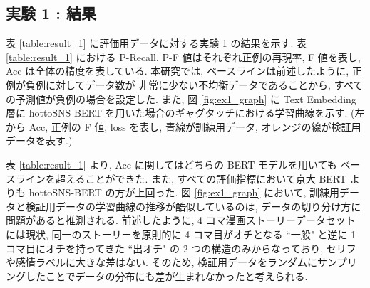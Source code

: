 \begin{table}[!h]
\vspace{10mm}
\caption{損失関数におけるクラス重み}
\label{table:ex_class_weight}
\centering
{}
\end{table}

\newpage
\changeindent{0cm}
\subsection{実験 1 : 結果}
\changeindent{2cm}

表 \ref{table:result_1} に評価用データに対する実験 1 の結果を示す. 表 \ref{table:result_1} における P-Recall, P-F 値はそれぞれ正例の再現率, F 値を表し, Acc は全体の精度を表している.
本研究では, ベースラインは前述したように, 正例が負例に対してデータ数が
非常に少ない不均衡データであることから, すべての予測値が負例の場合を設定した.
また, 図 \ref{fig:ex1_graph} に Text Embedding 層に hottoSNS-BERT を用いた場合のギャグタッチにおける学習曲線を示す. (左から Acc, 正例の F 値, loss を表し, 青線が訓練用データ, オレンジの線が検証用データを表す.)

表 \ref{table:result_1} より, Acc に関してはどちらの BERT モデルを用いても
ベースラインを超えることができた. また, すべての評価指標において京大 BERT よりも hottoSNS-BERT の方が上回った. 図 \ref{fig:ex1_graph} において, 訓練用データと検証用データの学習曲線の推移が酷似しているのは, データの切り分け方に問題があると推測される. 前述したように, 4 コマ漫画ストーリーデータセットには現状, 同一のストーリーを原則的に 4 コマ目がオチとなる ``一般" と逆に 1 コマ目にオチを持ってきた ``出オチ" の 2 つの構造のみからなっており, セリフや感情ラベルに大きな差はない. そのため, 検証用データをランダムにサンプリングしたことでデータの分布にも差が生まれなかったと考えられる.

